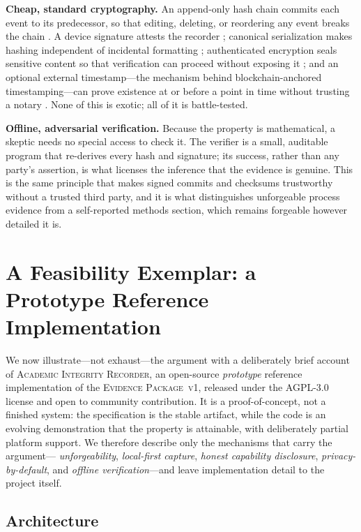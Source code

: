 \documentclass[11pt]{article}
\newcommand{\pkg}{\textsc}
\newcommand{\air}{\pkg{Academic Integrity Recorder}\xspace}
\newcommand{\evpkg}{\textsc{Evidence Package~v1}\xspace}
\begin{document}
\textbf{Cheap, standard cryptography.} An append-only hash chain commits each event to
its predecessor, so that editing, deleting, or reordering any event breaks the chain
\parencite{crosby2009}. A device signature attests the recorder \parencite{bernstein2012};
canonical serialization makes hashing independent of incidental formatting
\parencite{rfc8785}; authenticated encryption seals sensitive content so that verification
can proceed without exposing it \parencite{rfc8439}; and an optional external
timestamp---the mechanism behind blockchain-anchored timestamping---can prove existence
at or before a point in time without trusting a notary \parencite{opents}. None of this is
exotic; all of it is battle-tested.

\textbf{Offline, adversarial verification.} Because the property is mathematical, a
skeptic needs no special access to check it. The verifier is a small, auditable program
that re-derives every hash and signature; its success, rather than any party's
assertion, is what licenses the inference that the evidence is genuine. This is the
same principle that makes signed commits and checksums trustworthy without a trusted
third party, and it is what distinguishes unforgeable process evidence from a
self-reported methods section, which remains forgeable however detailed it is.

\section{A Feasibility Exemplar: a Prototype Reference Implementation}
\label{sec:design}

We now illustrate---not exhaust---the argument with a deliberately brief account of
\air, an open-source \emph{prototype} reference implementation of the \evpkg, released
under the AGPL-3.0 license and open to community contribution. It is a proof-of-concept,
not a finished system: the specification is the stable artifact, while the code is an
evolving demonstration that the property is attainable, with deliberately partial
platform support. We therefore describe only the mechanisms that carry the argument---
\emph{unforgeability}, \emph{local-first capture}, \emph{honest capability disclosure},
\emph{privacy-by-default}, and \emph{offline verification}---and leave implementation
detail to the project itself.

\subsection{Architecture}
\end{document}
